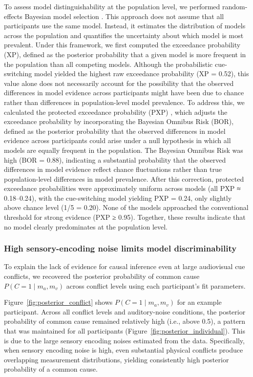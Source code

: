 \documentclass[9pt,lineno,doublespacing]{elife}
\begin{document}
To assess model distinguishability at the population level, we performed random-effects Bayesian model selection \citep{stephan2009bayesian,rigoux2014bayesian}. This approach does not assume that all participants use the same model. Instead, it estimates the distribution of models across the population and quantifies the uncertainty about which model is most prevalent. Under this framework, we first computed the exceedance probability (XP), defined as the posterior probability that a given model is more frequent in the population than all competing models. Although the probabilistic cue-switching model yielded the highest raw exceedance probability (XP = 0.52), this value alone does not necessarily account for the possibility that the observed differences in model evidence across participants might have been due to chance rather than differences in population-level model prevalence.
To address this, we calculated the protected exceedance probability (PXP) \citep{rigoux2014bayesian}, which adjusts the exceedance probability by incorporating the Bayesian Omnibus Risk (BOR), defined as the posterior probability that the observed differences in model evidence across participants could arise under a null hypothesis in which all models are equally frequent in the population. The Bayesian Omnibus Risk was high (BOR = 0.88), indicating a substantial probability that the observed differences in model evidence reflect chance fluctuations rather than true population-level differences in model prevalence. After this correction, protected exceedance probabilities were approximately uniform across models (all PXP ≈ 0.18–0.24), with the cue-switching model yielding PXP = 0.24, only slightly above chance level (1/5 = 0.20). None of the models approached the conventional threshold for strong evidence (PXP ≥ 0.95). Together, these results indicate that no model clearly predominates at the population level.


\subsubsection{High sensory-encoding noise limits model discriminability}
To explain the lack of evidence for causal inference even at large audiovisual cue conflicts, we recovered the posterior probability of common cause $P(C=1 \mid m_a, m_v)$ across conflict levels using each participant's fit parameters.

Figure~\ref{fig:posterior_conflict} shows $P(C=1 \mid m_a, m_v)$ for an example participant. Across all conflict levels and auditory-noise conditions, the posterior probability of common cause remained relatively high (i.e., above 0.5), a pattern that was maintained for all participants (Figure~\ref{fig:posterior_individual}). This is due to the large sensory encoding noises estimated from the data. Specifically, when sensory encoding noise is high, even substantial physical conflicts produce overlapping measurement distributions, yielding consistently high posterior probability of a common cause. 
\end{document}
